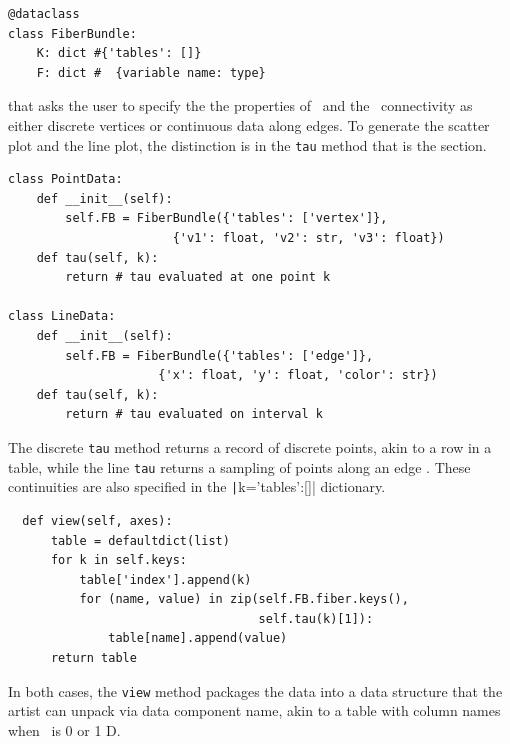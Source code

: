 \documentclass[../main.tex]{subfiles}
\begin{document}
\begin{verbatim}
@dataclass
class FiberBundle:
    K: dict #{'tables': []}
    F: dict #  {variable name: type}
\end{verbatim}
that asks the user to specify the the properties of \dfiber\ and the \dbase\ connectivity as either discrete vertices or continuous data along edges. To generate the scatter plot and the line plot, the distinction is in the \texttt{tau} method that is the section. 
\begin{verbatim}
class PointData:     
    def __init__(self):
        self.FB = FiberBundle({'tables': ['vertex']},  
                       {'v1': float, 'v2': str, 'v3': float})
    def tau(self, k):
        return # tau evaluated at one point k

class LineData:
    def __init__(self):
        self.FB = FiberBundle({'tables': ['edge']},  
                     {'x': float, 'y': float, 'color': str})
    def tau(self, k):
        return # tau evaluated on interval k
\end{verbatim}
The discrete \texttt{tau} method returns a record of discrete points, akin to a row in a table, while the line \texttt{tau} returns a sampling of points along an edge \dbasepoint. These continuities are also specified in the \texttt|k={'tables':[]}| dictionary. 
\begin{verbatim}
  def view(self, axes):
      table = defaultdict(list)
      for k in self.keys:
          table['index'].append(k)
          for (name, value) in zip(self.FB.fiber.keys(), 
                                   self.tau(k)[1]):
              table[name].append(value)
      return table
\end{verbatim}
In both cases, the \texttt{view} method packages the data into a data structure that the artist can unpack via data component name, akin to a table with column names when \dbase\ is 0 or 1 D. 
\end{document}
